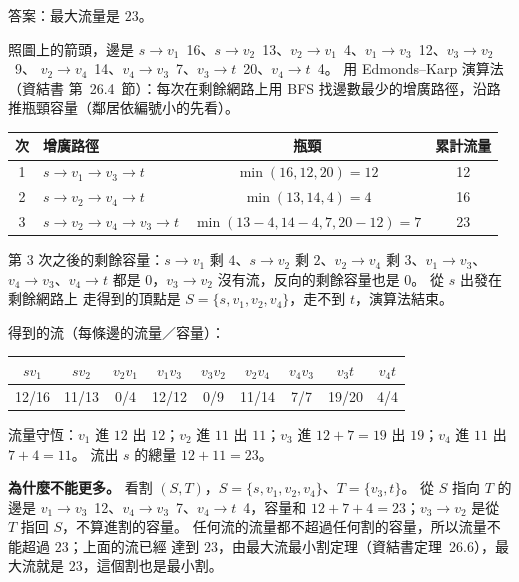 \begin{pastsoln}
答案：最大流量是 $23$。

照圖上的箭頭，邊是 $s \to v_1$~16、$s \to v_2$~13、$v_2 \to v_1$~4、$v_1 \to v_3$~12、$v_3 \to v_2$~9、
$v_2 \to v_4$~14、$v_4 \to v_3$~7、$v_3 \to t$~20、$v_4 \to t$~4。 用 Edmonds--Karp 演算法（資結書
第~26.4~節）：每次在剩餘網路上用 BFS 找邊數最少的增廣路徑，沿路推瓶頸容量（鄰居依編號小的先看）。

\begin{center}
\small
\begin{tabular}{clcc}
\toprule
次 & 增廣路徑 & 瓶頸 & 累計流量 \\
\midrule
1 & $s \to v_1 \to v_3 \to t$ & $\min(16, 12, 20) = 12$ & 12 \\
2 & $s \to v_2 \to v_4 \to t$ & $\min(13, 14, 4) = 4$ & 16 \\
3 & $s \to v_2 \to v_4 \to v_3 \to t$ & $\min(13 - 4, 14 - 4, 7, 20 - 12) = 7$ & 23 \\
\bottomrule
\end{tabular}
\end{center}

第 3 次之後的剩餘容量：$s \to v_1$ 剩 $4$、$s \to v_2$ 剩 $2$、$v_2 \to v_4$ 剩 $3$、$v_1 \to v_3$、
$v_4 \to v_3$、$v_4 \to t$ 都是 $0$，$v_3 \to v_2$ 沒有流，反向的剩餘容量也是 $0$。 從 $s$ 出發在剩餘網路上
走得到的頂點是 $S = \{s, v_1, v_2, v_4\}$，走不到 $t$，演算法結束。

得到的流（每條邊的流量／容量）：
\begin{center}
\small
\begin{tabular}{ccccccccc}
\toprule
$s v_1$ & $s v_2$ & $v_2 v_1$ & $v_1 v_3$ & $v_3 v_2$ & $v_2 v_4$ & $v_4 v_3$ & $v_3 t$ & $v_4 t$ \\
\midrule
12/16 & 11/13 & 0/4 & 12/12 & 0/9 & 11/14 & 7/7 & 19/20 & 4/4 \\
\bottomrule
\end{tabular}
\end{center}
流量守恆：$v_1$ 進 $12$ 出 $12$；$v_2$ 進 $11$ 出 $11$；$v_3$ 進 $12 + 7 = 19$ 出 $19$；$v_4$ 進 $11$
出 $7 + 4 = 11$。 流出 $s$ 的總量 $12 + 11 = 23$。

\textbf{為什麼不能更多。} 看割 $(S, T)$，$S = \{s, v_1, v_2, v_4\}$、$T = \{v_3, t\}$。 從 $S$ 指向 $T$
的邊是 $v_1 \to v_3$~12、$v_4 \to v_3$~7、$v_4 \to t$~4，容量和 $12 + 7 + 4 = 23$；$v_3 \to v_2$ 是從
$T$ 指回 $S$，不算進割的容量。 任何流的流量都不超過任何割的容量，所以流量不能超過 $23$；上面的流已經
達到 $23$，由最大流最小割定理（資結書定理~26.6），最大流就是 $23$，這個割也是最小割。
\end{pastsoln}
